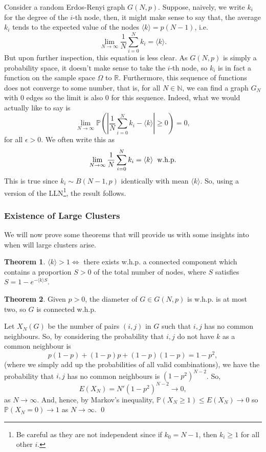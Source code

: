 \documentclass[
]{article}
\theoremstyle{definition}
\newtheorem{theorem}{Theorem}
\theoremstyle{definition}
\begin{document}
Consider a random Erdos-Renyi graph \(G(N, p)\). Suppose, naively, we
write \(k_i\) for the degree of the \(i\)-th node, then, it might make
sense to say that, the average \(k_i\) tends to the expected value of
the nodes \(\langle k \rangle = p(N - 1)\), i.e.
\[\lim_{N \to \infty} \frac{1}{N} \sum_{i = 0}^N k_i = \langle k \rangle.\]
But upon further inspection, this equation is less clear. As \(G(N, p)\)
is simply a probability space, it doesn't make sense to take the
\(i\)-th node, so \(k_i\) is in fact a function on the sample space
\(\Omega\) to \(\mathbb{R}\). Furthermore, this sequence of functions
does not converge to some number, that is, for all \(N \in \mathbb{N}\),
we can find a graph \(G_N\) with \(0\) edges so the limit is also \(0\)
for this sequence. Indeed, what we would actually like to say is
\[\lim_{N \to \infty} \mathbb{P} \left( \left| \frac{1}{N}\sum_{i = 0}^N k_i - 
  \langle k \rangle \right| \ge 0 \right) = 0, \] for all
\(\epsilon > 0\). We often write this as
\[\lim_{N \to \infty} \frac{1}{N} \sum_{i = 0}^N k_i = \langle k \rangle 
  \hspace{2mm} \text{w.h.p}.\] This is true since
\(k_i \sim B(N - 1, p)\) identically with mean \(\langle k \rangle\).
So, using a version of the
LLN\footnote{Be careful as they are not independent 
since if \(k_0 = N - 1\), then \(k_i \ge 1\) for all other \(i\).}, the
result follows.

\hypertarget{existence-of-large-clusters}{%
\subsubsection{Existence of Large
Clusters}\label{existence-of-large-clusters}}

We will now prove some theorems that will provide us with some insights
into when will large clusters arise.

\begin{theorem}
  \(\langle k \rangle > 1 \iff\) there exists w.h.p. a connected component which 
  contains a proportion \(S > 0\) of the total number of nodes, where \(S\) 
  satisfies \(S = 1 - e^{-\langle k \rangle S}\).
\end{theorem}

\begin{theorem}
  Given \(p > 0\), the diameter of \(G \in G(N, p)\) is w.h.p. is at most two, 
  so \(G\) is connected w.h.p.
\end{theorem}
\proof

Let \(X_N(G)\) be the number of pairs \((i, j)\) in \(G\) such that
\(i, j\) has no common neighbours. So, by considering the probability
that \(i, j\) do not have \(k\) as a common neighbour is
\[ p(1 - p) + (1 - p)p + (1- p)(1 - p) = 1 - p^2,\] (where we simply add
up the probabilities of all valid combinations), we have the probability
that \(i ,j\) has no common neighbours is \((1 - p^2)^{N - 2}\). So,
\[E(X_N) = N'(1 - p^2)^{N - 2} \to 0,\] as \(N \to \infty\). And, hence,
by Markov's inequality, \(\mathbb{P}(X_N \ge 1) \le E(X_N) \to 0\) so
\(\mathbb{P}(X_N = 0) \to 1\) as \(N \to \infty\). \qed
\end{document}
